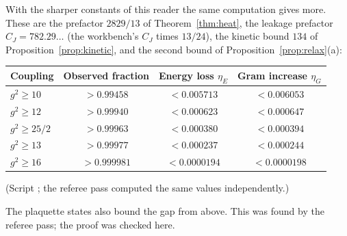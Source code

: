 With the sharper constants of this reader the same computation gives more. These are the prefactor $2829/13$ of Theorem~\ref{thm:heat}, the leakage prefactor $C_J=782.29\ldots$ (the workbench's $C_J$ times $13/24$), the kinetic bound $134$ of Proposition~\ref{prop:kinetic}, and the second bound of Proposition~\ref{prop:relax}(a):

\begin{center}\small
\begin{tabular}{@{}lccc@{}}
\toprule
Coupling & Observed fraction & Energy loss $\eta_E$ & Gram increase $\eta_G$\\
\midrule
$g^2\ge10$ & $>0.99458$ & $<0.005713$ & $<0.006053$\\
$g^2\ge12$ & $>0.99940$ & $<0.000623$ & $<0.000647$\\
$g^2\ge25/2$ & $>0.99963$ & $<0.000380$ & $<0.000394$\\
$g^2\ge13$ & $>0.99977$ & $<0.000237$ & $<0.000244$\\
$g^2\ge16$ & $>0.999981$ & $<0.0000194$ & $<0.0000198$\\
\bottomrule
\end{tabular}
\end{center}
(Script ; the referee pass computed the same values independently.)

The plaquette states also bound the gap from above. This was found by the referee pass; the proof was checked here.

